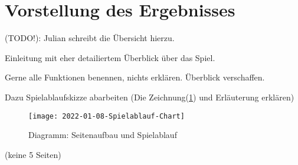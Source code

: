 

\section{Vorstellung des Ergebnisses}

(TODO!): Julian schreibt die Übersicht hierzu.

Einleitung mit eher detailiertem Überblick über das Spiel.

Gerne alle Funktionen benennen, nichts erklären. Überblick verschaffen. 


Dazu Spielablaufskizze abarbeiten (Die Zeichnung(\ref{fig:2022-01-08-Spielablauf-Chart}) und Erläuterung erklären)

\begin{figure}[H]
    \centering
    \caption{Diagramm: Seitenaufbau und Spielablauf}
    \label{fig:2022-01-08-Spielablauf-Chart}
    \texttt{[image: 2022-01-08-Spielablauf-Chart]}
\end{figure}


(keine 5 Seiten)

